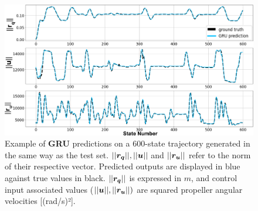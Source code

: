 \begin{figure}[htp]
    \centering
    \includegraphics[width=0.99\linewidth]{figures/learning_quadrotor/long_pred.png}
    \caption{Example of \textbf{GRU} predictions on a 600-state trajectory generated in the same way as the test set. $||\boldsymbol{r_q}||, ||\boldsymbol{u}||$ and $||\boldsymbol{r_u}||$ refer to the norm of their respective vector. Predicted outputs are displayed in blue against true values in black. $||\boldsymbol{r_q}||$ is expressed in $m$, and control input associated values ($||\boldsymbol{u}||,||\boldsymbol{r_u}||)$ are squared propeller angular velocities [(rad/s)²].}
    \label{fig:long_test}
\end{figure}

